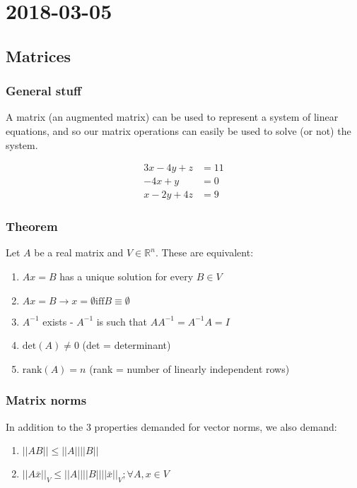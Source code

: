\section{2018-03-05}

\subsection{Matrices}

\subsubsection{General stuff}

A matrix (an augmented matrix) can be used to represent a system of linear equations, and so our matrix operations can easily be used to solve (or not) the system.

\begin{align*}
  3x -  4y + z  & = 11 \\
  -4x + y       & = 0 \\
  x -   2y + 4z & = 9
\end{align*}

\subsubsection{Theorem}

Let $A$ be a real matrix and $V \in \mathbb{R}^n$. These are equivalent:

\begin{enumerate}
  \item $Ax = B$ has a unique solution for every $B \in V$
  \item $Ax = B \rightarrow x = \emptyset \text{iff} B \equiv \emptyset$
  \item $A^{-1}$ exists - $A^{-1}$ is such that $AA^{-1} = A^{-1}A = I$
  \item $\text{det}(A) \neq 0$ (det = determinant)
  \item $\text{rank}(A) = n$ (rank = number of linearly independent rows)
\end{enumerate}

\subsubsection{Matrix norms}

In addition to the 3 properties demanded for vector norms, we also demand:

\begin{enumerate}
  \item $||AB|| \leq ||A|| ||B||$
  \item $||A\bar{x}||_V \leq ||A|| ||B|| ||\bar{x}||_V; \forall A, x \in V$
\end{enumerate}

